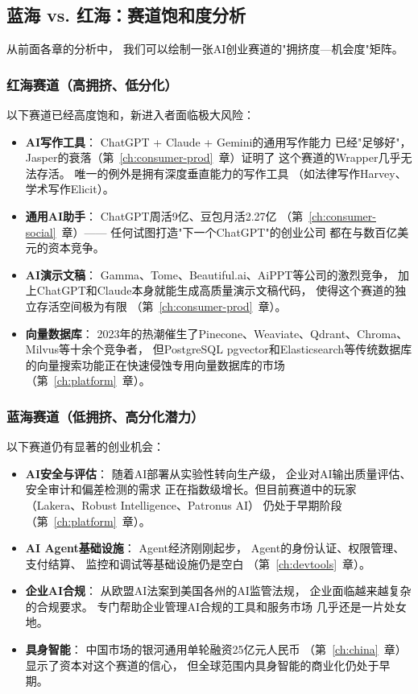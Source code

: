 \subsection{蓝海 vs. 红海：赛道饱和度分析}

从前面各章的分析中，
我们可以绘制一张AI创业赛道的"拥挤度—机会度"矩阵。

\subsubsection{红海赛道（高拥挤、低分化）}
以下赛道已经高度饱和，新进入者面临极大风险：
\begin{itemize}
  \item \textbf{AI写作工具}：
    ChatGPT + Claude + Gemini的通用写作能力
    已经"足够好"，
    Jasper的衰落（第~\ref{ch:consumer-prod}~章）证明了
    这个赛道的Wrapper几乎无法存活。
    唯一的例外是拥有深度垂直能力的写作工具
    （如法律写作Harvey、学术写作Elicit）。
  \item \textbf{通用AI助手}：
    ChatGPT周活9亿、豆包月活2.27亿
    （第~\ref{ch:consumer-social}~章）——
    任何试图打造"下一个ChatGPT"的创业公司
    都在与数百亿美元的资本竞争。
  \item \textbf{AI演示文稿}：
    Gamma、Tome、Beautiful.ai、AiPPT等公司的激烈竞争，
    加上ChatGPT和Claude本身就能生成高质量演示文稿代码，
    使得这个赛道的独立存活空间极为有限
    （第~\ref{ch:consumer-prod}~章）。
  \item \textbf{向量数据库}：
    2023年的热潮催生了Pinecone、Weaviate、Qdrant、Chroma、
    Milvus等十余个竞争者，
    但PostgreSQL pgvector和Elasticsearch等传统数据库
    的向量搜索功能正在快速侵蚀专用向量数据库的市场
    （第~\ref{ch:platform}~章）。
\end{itemize}

\subsubsection{蓝海赛道（低拥挤、高分化潜力）}
以下赛道仍有显著的创业机会：
\begin{itemize}
  \item \textbf{AI安全与评估}：
    随着AI部署从实验性转向生产级，
    企业对AI输出质量评估、安全审计和偏差检测的需求
    正在指数级增长。但目前赛道中的玩家
    （Lakera、Robust Intelligence、Patronus AI）
    仍处于早期阶段（第~\ref{ch:platform}~章）。
  \item \textbf{AI Agent基础设施}：
    Agent经济刚刚起步，
    Agent的身份认证、权限管理、支付结算、
    监控和调试等基础设施仍是空白
    （第~\ref{ch:devtools}~章）。
  \item \textbf{企业AI合规}：
    从欧盟AI法案到美国各州的AI监管法规，
    企业面临越来越复杂的合规要求。
    专门帮助企业管理AI合规的工具和服务市场
    几乎还是一片处女地。
  \item \textbf{具身智能}：
    中国市场的银河通用单轮融资25亿元人民币
    （第~\ref{ch:china}~章）显示了资本对这个赛道的信心，
    但全球范围内具身智能的商业化仍处于早期。
\end{itemize}

